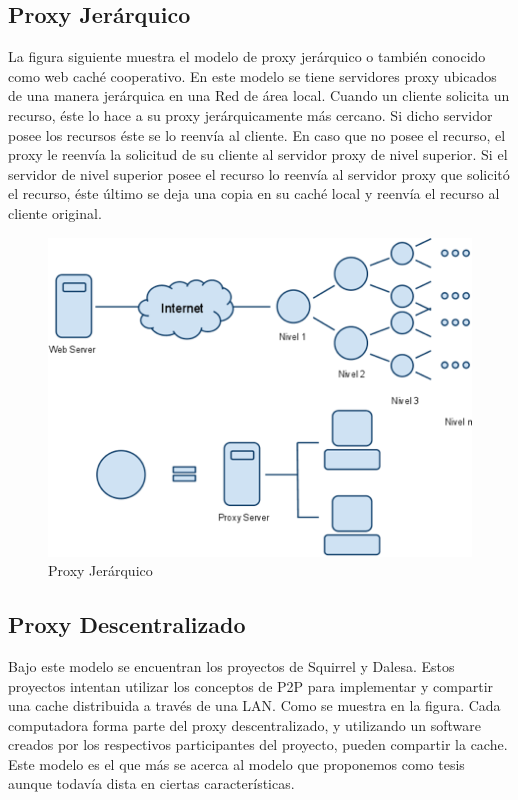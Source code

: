 \subsection{Proxy Jerárquico}

La figura siguiente muestra el modelo de proxy jerárquico o también conocido como web caché cooperativo. En este modelo se tiene servidores proxy ubicados de una manera jerárquica en una Red de área local. Cuando un cliente solicita un recurso, éste lo hace a su proxy jerárquicamente más cercano. Si dicho servidor posee los recursos éste se lo reenvía al cliente. En caso que no posee el recurso, el proxy le reenvía la solicitud de su cliente al servidor proxy de nivel superior. Si el servidor de nivel superior posee el recurso lo reenvía al servidor proxy que solicitó el recurso, éste último se deja una copia en su caché local y reenvía el recurso al cliente original.

\begin{figure}[h]
  \centering
    \includegraphics[scale=1]{gfx/proxy_jerarquico}
  \caption{Proxy Jerárquico}
  \label{conexionhttp}
\end{figure}


\subsection{Proxy Descentralizado}

Bajo este modelo se encuentran los proyectos de Squirrel y Dalesa. Estos proyectos intentan utilizar los conceptos de P2P para implementar y compartir una cache distribuida a través de una LAN. Como se muestra en la figura. Cada computadora forma parte del proxy descentralizado, y utilizando un software creados por los respectivos participantes del proyecto, pueden compartir la cache. Este modelo es el que más se acerca al modelo que proponemos como tesis aunque todavía dista en ciertas características.

